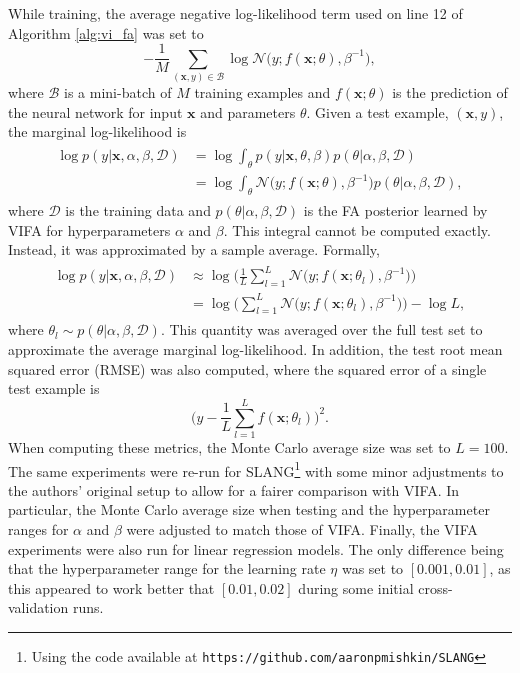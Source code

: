 \documentclass[msc,deptreport.inf]{infthesis} %
\newcommand{\matr}[1]{\mathbf{#1}}
\begin{document}
While training, the average negative log-likelihood term used on line 12 of Algorithm \ref{alg:vi_fa} was set to
\begin{equation}\label{eqn:train_nll}
	-\frac{1}{M} \sum_{(\matr{x}, y) \in \mathcal{B}} \log \mathcal{N}\big(y; f(\matr{x}; \theta), \beta^{-1}\big),
\end{equation}
where $\mathcal{B}$ is a mini-batch of $M$ training examples and $f(\matr{x}; \theta)$ is the prediction of the neural network for input $\matr{x}$ and parameters $\theta$. Given a test example, $(\matr{x}, y)$, the marginal log-likelihood is
\begin{align}
\begin{split}
	\log p(y | \matr{x}, \alpha, \beta, \mathcal{D}) 
	& = \log \int_\theta p(y | \matr{x}, \theta, \beta) p(\theta | \alpha, \beta, \mathcal{D}) \\
	& = \log \int_\theta \mathcal{N}\big(y; f(\matr{x}; \theta), \beta^{-1}\big) p(\theta | \alpha, \beta, \mathcal{D}),
\end{split}
\end{align}
where $\mathcal{D}$ is the training data and $p(\theta | \alpha, \beta, \mathcal{D})$ is the FA posterior learned by VIFA for hyperparameters $\alpha$ and $\beta$. This integral cannot be computed exactly. Instead, it was approximated by a sample average. Formally, 
\begin{align}
\begin{split}
	\log p(y | \matr{x}, \alpha, \beta, \mathcal{D}) 
	& \approx \log \Bigg( \frac{1}{L} \sum_{l=1}^L \mathcal{N}\big(y; f(\matr{x}; \theta_l), \beta^{-1}\big) \Bigg) \\
	& = \log \Bigg( \sum_{l=1}^L \mathcal{N}\big(y; f(\matr{x}; \theta_l), \beta^{-1}\big) \Bigg) - \log L,
\end{split}
\end{align}
where $\theta_l \sim p(\theta | \alpha, \beta, \mathcal{D})$. This quantity was averaged over the full test set to approximate the average marginal log-likelihood. In addition, the test root mean squared error (RMSE) was also computed, where the squared error of a single test example is
\begin{equation}
	\Bigg(y - \frac{1}{L} \sum_{l=1}^L f(\matr{x}; \theta_l)\Bigg)^2.
\end{equation}
When computing these metrics, the Monte Carlo average size was set to $L=100$. The same experiments were re-run for SLANG\footnote{Using the code available at \texttt{https://github.com/aaronpmishkin/SLANG}} with some minor adjustments to the authors' original setup to allow for a fairer comparison with VIFA. In particular, the Monte Carlo average size when testing and the hyperparameter ranges for $\alpha$ and $\beta$ were adjusted to match those of VIFA. Finally, the VIFA experiments were also run for linear regression models. The only difference being that the hyperparameter range for the learning rate $\eta$ was set to $[0.001, 0.01]$, as this appeared to work better that $[0.01, 0.02]$ during some initial cross-validation runs. 
\end{document}
